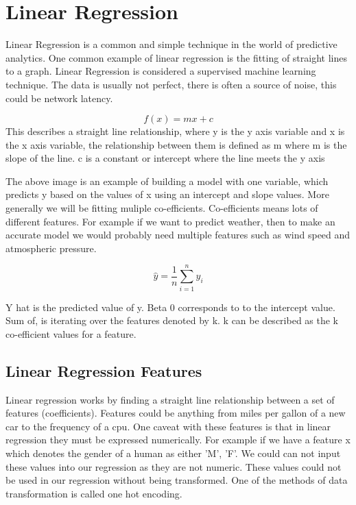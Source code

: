 \section{Linear Regression}

Linear Regression is a common and simple technique in the world of predictive analytics. One common example of linear regression is the fitting of straight lines to a graph. Linear Regression is considered a supervised machine learning technique. The data is usually not perfect, there is often a source of noise, this could be network latency.

\begin{equation}
    f(x) = mx+c
\end{equation}
This describes a straight line relationship, where y is the y axis variable and x is the x axis variable, the relationship between them is defined as m where m is the slope of the line. c is a constant or intercept where the line meets the y axis

The above image is an example of building a model with one variable, which predicts y based on the values of x using an intercept and slope values. More generally we will be fitting muliple co-efficients. Co-efficients means lots of different features. For example if we want to predict weather, then to make an accurate model we would probably need multiple features such as wind speed and atmospheric pressure.

\begin{equation}
\hat{y} = \frac{1}{n}\sum_{i=1}^n y_i
\end{equation}

Y hat is the predicted value of y. Beta 0 corresponds to to the intercept value. Sum of, is iterating over the features denoted by k. k can be described as the k co-efficient values for a feature.

\subsection{Linear Regression Features}

Linear regression works by finding a straight line relationship between a set of features (coefficients). Features could be anything from miles per gallon of a new car to the frequency of a cpu. One caveat with these features is that in linear regression they must be expressed numerically. For example if we have a feature x which denotes the gender of a human as either 'M', 'F'. We could can not input these values into our regression as they are not numeric. These values could not be used in our regression without being transformed. One of the methods of data transformation is called one hot encoding. 

